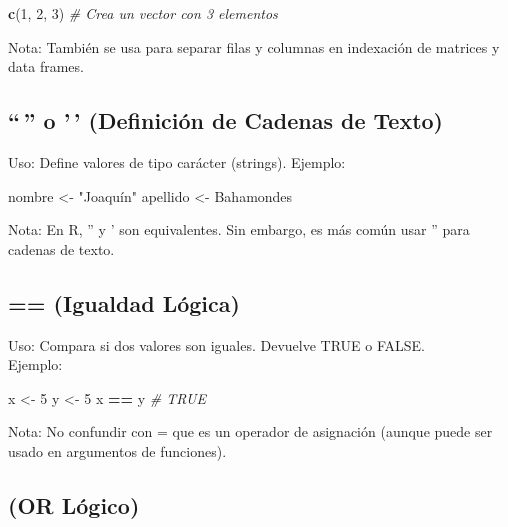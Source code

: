 \documentclass[
]{book}
\newenvironment{Shaded}{\begin{snugshade}}{\end{snugshade}}
\newcommand{\CommentTok}[1]{\textcolor[rgb]{0.56,0.35,0.01}{\textit{#1}}}
\newcommand{\DecValTok}[1]{\textcolor[rgb]{0.00,0.00,0.81}{#1}}
\newcommand{\FunctionTok}[1]{\textcolor[rgb]{0.13,0.29,0.53}{\textbf{#1}}}
\newcommand{\NormalTok}[1]{#1}
\newcommand{\OtherTok}[1]{\textcolor[rgb]{0.56,0.35,0.01}{#1}}
\newcommand{\SpecialCharTok}[1]{\textcolor[rgb]{0.81,0.36,0.00}{\textbf{#1}}}
\newcommand{\StringTok}[1]{\textcolor[rgb]{0.31,0.60,0.02}{#1}}
\begin{document}
\begin{Shaded}
\begin{Highlighting}[]
\FunctionTok{c}\NormalTok{(}\DecValTok{1}\NormalTok{, }\DecValTok{2}\NormalTok{, }\DecValTok{3}\NormalTok{)  }\CommentTok{\# Crea un vector con 3 elementos}
\end{Highlighting}
\end{Shaded}

Nota: También se usa para separar filas y columnas en indexación de matrices y data frames.

\hypertarget{texto}{%
\subsection{``\,'' o '\,' (Definición de Cadenas de Texto)}\label{texto}}

Uso: Define valores de tipo carácter (strings).
Ejemplo:

\begin{Shaded}
\begin{Highlighting}[]
\NormalTok{nombre }\OtherTok{\textless{}{-}} \StringTok{"Joaquín"}
\NormalTok{apellido }\OtherTok{\textless{}{-}} \StringTok{\textquotesingle{}Bahamondes\textquotesingle{}}
\end{Highlighting}
\end{Shaded}

Nota: En R, '' y ' son equivalentes. Sin embargo, es más común usar '' para cadenas de texto.

\hypertarget{equivalencia}{%
\subsection{== (Igualdad Lógica)}\label{equivalencia}}

Uso: Compara si dos valores son iguales. Devuelve TRUE o FALSE.\\
Ejemplo:

\begin{Shaded}
\begin{Highlighting}[]
\NormalTok{x }\OtherTok{\textless{}{-}} \DecValTok{5}
\NormalTok{y }\OtherTok{\textless{}{-}} \DecValTok{5}
\NormalTok{x }\SpecialCharTok{==}\NormalTok{ y  }\CommentTok{\# TRUE}
\end{Highlighting}
\end{Shaded}

Nota: No confundir con = que es un operador de asignación (aunque puede ser usado en argumentos de funciones).

\hypertarget{OR}{%
\subsection{\textbar{} (OR Lógico)}\label{OR}}
\end{document}
